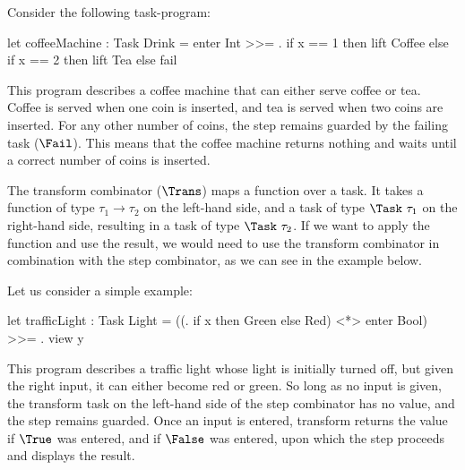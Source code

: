   Consider the following task-program:
  \begin{TASK}
    let coffeeMachine : Task Drink = enter Int >>= \x.
      if x == 1 then lift Coffee else if x == 2 then lift Tea else fail
  \end{TASK}
  \noindent
  This program describes a coffee machine that can either serve coffee or tea.
  Coffee is served when one coin is inserted, and tea is served when two coins are inserted.
  For any other number of coins, the step remains guarded by the failing task ($\Fail$).
  This means that the coffee machine returns nothing and waits until a correct number of coins is inserted.
\stopexample

The transform combinator ($\Trans$) maps a function over a task.
It takes a function of type $\tau_1 \to \tau_2$ on the left-hand side,
and a task of type $\Task\ \tau_1$ on the right-hand side, resulting in a task of type $\Task\ \tau_2$.
If we want to apply the function and use the result, we would need to use the transform combinator in combination with the step combinator,
as we can see in the example below.

  Let us consider a simple example:
  \begin{TASK}
    let trafficLight : Task Light =
      ((\x. if x then Green else Red) <*> enter Bool) >>= \y. view y
  \end{TASK}
  This program describes a traffic light whose light is initially turned off, but given the right input, it can either become red or green.
  So long as no input is given, the transform task on the left-hand side of the step combinator has no value, and the step remains guarded.
  Once an input is entered, transform returns the value  if $\True$ was entered, and  if $\False$ was entered, upon which the step proceeds and displays the result.
\stopexample


